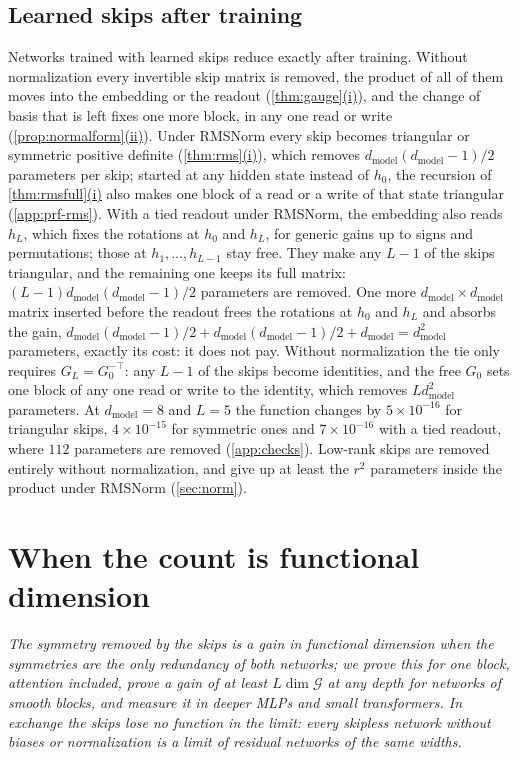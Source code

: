 \documentclass[10pt]{article}
\theoremstyle{definition}
\theoremstyle{remark}
\newcommand{\dm}{d_{\mathrm{model}}}
\newcommand{\G}{\mathcal{G}}
\newcommand{\takeaway}[1]{\noindent\textit{#1}\par\smallskip}
\DeclareRobustCommand{\cpref}[2]{\hyperref[#1:#2]{\cref*{#1}(#2)}}
\begin{document}
\subsection{Learned skips after training}\label{sec:learned}

Networks trained with learned skips reduce exactly after training. Without normalization every invertible skip matrix is removed, the product of all of them moves into the embedding or the readout (\cpref{thm:gauge}{i}), and the change of basis that is left fixes one more block, in any one read or write (\cpref{prop:normalform}{ii}). Under RMSNorm every skip becomes triangular or symmetric positive definite (\cpref{thm:rms}{i}), which removes $\dm(\dm-1)/2$ parameters per skip; started at any hidden state instead of $h_0$, the recursion of \cpref{thm:rmsfull}{i} also makes one block of a read or a write of that state triangular (\cref{app:prf-rms}). With a tied readout under RMSNorm, the embedding also reads $h_L$, which fixes the rotations at $h_0$ and $h_L$, for generic gains up to signs and permutations; those at $h_1, \dots, h_{L-1}$ stay free. They make any $L - 1$ of the skips triangular, and the remaining one keeps its full matrix: $(L-1)\dm(\dm-1)/2$ parameters are removed. One more $\dm \times \dm$ matrix inserted before the readout frees the rotations at $h_0$ and $h_L$ and absorbs the gain, $\dm(\dm-1)/2 + \dm(\dm-1)/2 + \dm = \dm^2$ parameters, exactly its cost: it does not pay. Without normalization the tie only requires $G_L = G_0^{-\top}$: any $L - 1$ of the skips become identities, and the free $G_0$ sets one block of any one read or write to the identity, which removes $L\dm^2$ parameters. At $\dm = 8$ and $L = 5$ the function changes by $5\times10^{-16}$ for triangular skips, $4\times10^{-15}$ for symmetric ones and $7\times10^{-16}$ with a tied readout, where $112$ parameters are removed (\cref{app:checks}). Low-rank skips are removed entirely without normalization, and give up at least the $r^2$ parameters inside the product under RMSNorm (\cref{sec:norm}).

\section{When the count is functional dimension}\label{sec:gain}

\takeaway{The symmetry removed by the skips is a gain in functional dimension when the symmetries are the only redundancy of both networks; we prove this for one block, attention included, prove a gain of at least $L\dim\G$ at any depth for networks of smooth blocks, and measure it in deeper MLPs and small transformers. In exchange the skips lose no function in the limit: every skipless network without biases or normalization is a limit of residual networks of the same widths.}
\end{document}

